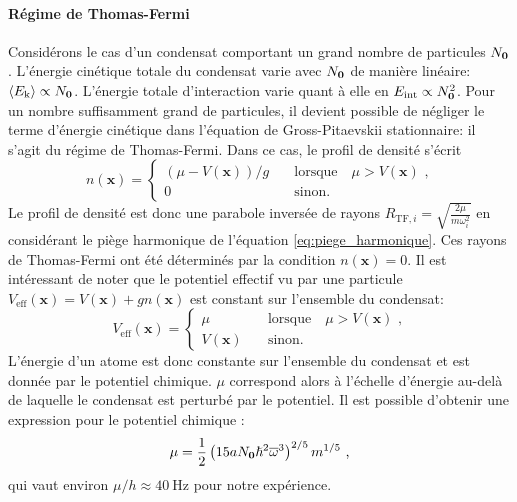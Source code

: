\paragraph*{Régime de Thomas-Fermi}
Considérons le cas d'un condensat comportant un grand nombre de particules $N_{\mathbf{0}}$. L'énergie cinétique totale du condensat varie avec $N_{\mathbf{0}}$ de manière linéaire: $\left\langle E_{\mathrm{k}}\right\rangle\propto N_{\mathbf{0}}$. L'énergie totale d'interaction varie quant à elle en $E_{\mathrm{int}}\propto N_{\mathbf{0}}^2$. Pour un nombre suffisamment grand de particules, il devient possible de négliger le terme d'énergie cinétique dans l'équation de Gross-Pitaevskii stationnaire: il s'agit du régime de Thomas-Fermi.
Dans ce cas, le profil de densité s'écrit
\begin{equation}
n(\mathbf{x})=\left\{
					\begin{array}{ll}
						(\mu-V(\mathbf{x}))/g &\quad \text{lorsque} \quad \mu>V(\mathbf{x}) \text{ ,}\\
						0 &\quad \text{sinon.}
					\end{array} 
				\right.
				\label{eq:thomas_fermi}
\end{equation}
Le profil de densité est donc une parabole inversée de rayons $R_{\mathrm{TF},i}=\sqrt{\frac{2\mu}{m\omega_i^2}}$ en considérant le piège harmonique de l'équation \ref{eq:piege_harmonique}.
Ces rayons de Thomas-Fermi ont été déterminés par la condition $n(\mathbf{x})=0$. Il est intéressant de noter que le potentiel effectif vu par une particule $V_{\mathrm{eff}}(\mathbf{x})=V(\mathbf{x})+gn(\mathbf{x})$ est constant sur l'ensemble du condensat:
\begin{equation}
V_{\mathrm{eff}}(\mathbf{x})= \left\{
									\begin{array}{ll}
										\mu &\quad \text{lorsque} \quad \mu>V(\mathbf{x}) \text{ ,}\\
										V(\mathbf{x}) &\quad \text{sinon.}
									\end{array}
							\right.
\end{equation}
L'énergie d'un atome est donc constante sur l'ensemble du condensat et est donnée par le potentiel chimique. $\mu$ correspond alors à l'échelle d'énergie au-delà de laquelle le condensat est perturbé par le potentiel. Il est possible d'obtenir une expression pour le potentiel chimique \citep{pethick2008bose}: 
\begin{equation}
\mu=\frac{1}{2} \left( 15a N_{\mathbf{0}} \hslash^2 \overline{\omega}^3 \right) ^{2/5} m^{1/5} \text{ ,}
\end{equation}
qui vaut environ $\mu/h\approx\SI{40}{\hertz}$ pour notre expérience.

